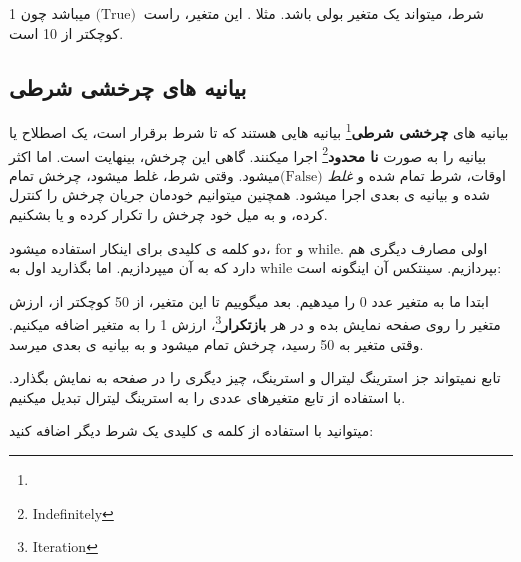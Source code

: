 \documentclass[14pt,a4paper]{memoir}
\begin{document}
\begin{tip}
	شرط، میتواند یک متغیر بولی باشد. مثلا . این متغیر، راست $\text{(True)}\ $ میباشد چون 1 کوچکتر از 10 است.
\end{tip}


\subsection{بیانیه های چرخشی شرطی}\label{pyloops}
	 
	 بیانیه های \textbf{چرخشی شرطی}\footnote{} بیانیه هایی هستند که تا شرط برقرار است، یک اصطلاح یا بیانیه را به صورت \textbf{نا محدود}\footnote{Indefinitely} اجرا میکنند. گاهی این چرخش، بینهایت است. اما اکثر اوقات، شرط تمام شده و \textit{غلط} $\text{(False)}  $میشود. وقتی شرط، غلط میشود، چرخش تمام شده و بیانیه ی بعدی اجرا میشود. همچنین میتوانیم خودمان جریان چرخش را کنترل کرده، و به میل خود چرخش را تکرار کرده و یا بشکنیم.
	 
	 دو کلمه ی کلیدی برای اینکار استفاده میشود، for و while. اولی مصارف دیگری هم دارد که به آن میپردازیم. اما بگذارید اول به while بپردازیم. سینتکس آن اینگونه است:
	 
	 
	 
	 
	 \begin{latin}
	
\end{latin}
	 
	 
	ابتدا ما به متغیر   عدد 0 را میدهیم. بعد میگوییم تا این متغیر، از 50 کوچکتر از، ارزش متغیر را روی صفحه نمایش بده و در هر \textbf{بازتکرار}\footnote{Iteration}، ارزش 1 را به متغیر اضافه میکنیم. وقتی متغیر به 50 رسید، چرخش تمام میشود و به بیانیه ی بعدی میرسد. 
	
	\begin{tip}
	تابع  نمیتواند جز استرینگ لیترال و استرینگ، چیز دیگری را در صفحه به نمایش بگذارد. با استفاده از تابع   متغیرهای عددی را به استرینگ لیترال تبدیل میکنیم.
	\end{tip}
	 
	 
	 
	 
	 میتوانید با استفاده از کلمه ی کلیدی  یک شرط دیگر اضافه کنید:
	 
\end{document}
